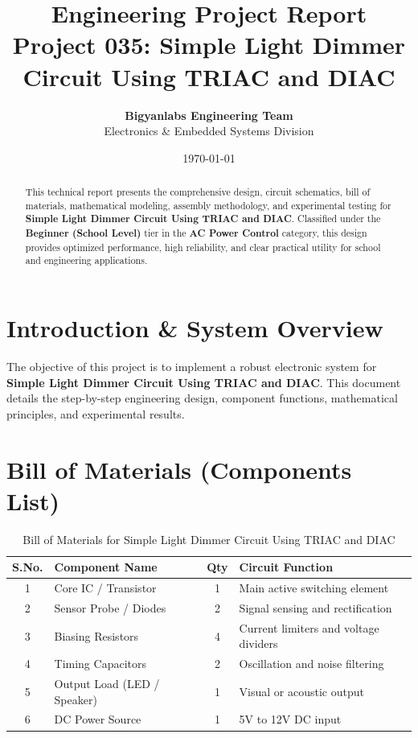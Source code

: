 \documentclass[11pt,a4paper]{article}
\title{\textbf{\Huge Engineering Project Report}\\[0.5em] \Large Project 035: Simple Light Dimmer Circuit Using TRIAC and DIAC}
\author{\textbf{Bigyanlabs Engineering Team}\\ Electronics \& Embedded Systems Division}
\date{\today}
\begin{document}
\maketitle
\thispagestyle{empty}

\begin{abstract}
This technical report presents the comprehensive design, circuit schematics, bill of materials, mathematical modeling, assembly methodology, and experimental testing for \textbf{Simple Light Dimmer Circuit Using TRIAC and DIAC}. Classified under the \textbf{Beginner (School Level)} tier in the \textbf{AC Power Control} category, this design provides optimized performance, high reliability, and clear practical utility for school and engineering applications.
\end{abstract}

\newpage
\tableofcontents
\newpage

\section{Introduction \& System Overview}
The objective of this project is to implement a robust electronic system for \textbf{Simple Light Dimmer Circuit Using TRIAC and DIAC}. This document details the step-by-step engineering design, component functions, mathematical principles, and experimental results.

\section{Bill of Materials (Components List)}
\begin{table}[h!]
\centering
\caption{Bill of Materials for Simple Light Dimmer Circuit Using TRIAC and DIAC}
\vspace{0.5em}
\begin{tabular}{clcp{7cm}}
\toprule
\textbf{S.No.} & \textbf{Component Name} & \textbf{Qty} & \textbf{Circuit Function} \\
\midrule
1 & Core IC / Transistor & 1 & Main active switching element \\
2 & Sensor Probe / Diodes & 2 & Signal sensing and rectification \\
3 & Biasing Resistors & 4 & Current limiters and voltage dividers \\
4 & Timing Capacitors & 2 & Oscillation and noise filtering \\
5 & Output Load (LED / Speaker) & 1 & Visual or acoustic output \\
6 & DC Power Source & 1 & 5V to 12V DC input \\
\bottomrule
\end{tabular}
\end{table}
\end{document}
